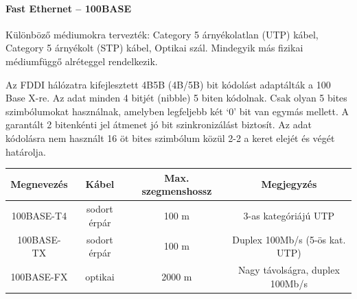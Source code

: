 \paragraph{Fast Ethernet -- 100BASE}
Különböző médiumokra tervezték: Category 5 árnyékolatlan (UTP) kábel, Category 5 árnyékolt (STP) kábel, Optikai szál. Mindegyik más fizikai médiumfüggő alréteggel rendelkezik.

Az FDDI hálózatra kifejlesztett 4B5B (4B/5B) bit kódolást adaptálták a 100 Base X-re. Az adat minden 4 bitjét (nibble) 5 biten kódolnak. Csak olyan 5 bites szimbólumokat használnak, amelyben legfeljebb két ‘0’ bit van egymás mellett. A garantált 2 bitenkénti jel átmenet jó bit szinkronizálást biztosít. Az adat kódolásra nem használt 16 öt bites szimbólum közül 2-2 a keret elejét és végét határolja.\\
\begin{tabular}{|c|c|c|c|}
	\hline 
	Megnevezés & Kábel & Max. szegmenshossz & Megjegyzés \\ 
	\hline 
	100BASE-T4 & sodort érpár & 100 m & 3-as kategóriájú UTP \\ 
	\hline 
	100BASE-TX & sodort érpár & 100 m & Duplex 100Mb/s (5-ös kat. UTP) \\ 
	\hline 
	100BASE-FX & optikai & 2000 m & Nagy távolságra, duplex 100Mb/s \\ 
	\hline 
\end{tabular} 

